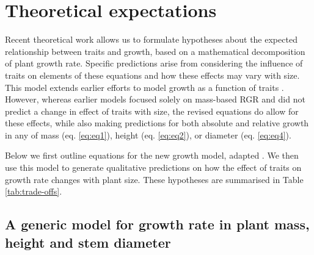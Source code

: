 \documentclass[a4paper,11pt]{article}
\begin{document}
\section*{Theoretical expectations}\label{theory}

Recent theoretical work \citep{Falster:2011ii} allows us to formulate hypotheses about the expected relationship between traits and growth, based on a mathematical decomposition of plant growth rate. Specific predictions arise from considering the influence of traits on elements of these equations and how these effects may vary with size. This model extends earlier efforts to model growth as a function of traits \citep{Lambers:1992bj,Cornelissen:1996hf,Wright:2000kw,Enquist:2007ek}. However, whereas earlier models focused solely on mass-based RGR and did not predict a change in effect of traits with size, the revised equations do allow for these effects, while also making predictions for both absolute and relative growth in any of mass (eq. \ref{eq:eq1}), height (eq. \ref{eq:eq2}), or diameter (eq. \ref{eq:eq4}).

Below we first outline equations for the new growth model, adapted \citet{Falster:2011ii}. We then use this model to generate qualitative predictions on how the effect of traits on growth rate changes with plant size. These hypotheses are summarised in Table \ref{tab:trade-offs}.

\subsection*{A generic model for growth rate in plant mass, height and stem diameter}\label{sec:growth}
\end{document}
